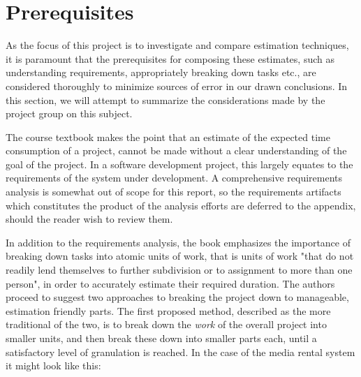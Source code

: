 \section{Prerequisites}
As the focus of this project is to investigate and compare estimation techniques, it is paramount that the prerequisites for composing these estimates, such as understanding requirements, appropriately breaking down tasks etc., are considered thoroughly to minimize sources of error in our drawn conclusions. In this section, we will attempt to summarize the considerations made by the project group on this subject.

The course textbook makes the point that an estimate of the expected time consumption of a project, cannot be made without a clear understanding of the goal of the project. In a software development project, this largely equates to the requirements of the system under development. A comprehensive requirements analysis is somewhat out of scope for this report, so the requirements artifacts which constitutes the product of the analysis efforts are deferred to the appendix, should the reader wish to review them.

In addition to the requirements analysis, the book emphasizes the importance of breaking down tasks into atomic units of work, that is units of work "that do not readily lend themselves to further subdivision or to assignment to more than one person", in order to accurately estimate their required duration. The authors proceed to suggest two approaches to breaking the project down to manageable, estimation friendly parts. The first proposed method, described as the more traditional of the two, is to break down the \textit{work} of the overall project into smaller units, and then break these down into smaller parts each, until a satisfactory level of granulation is reached. In the case of the media rental system it might look like this:

